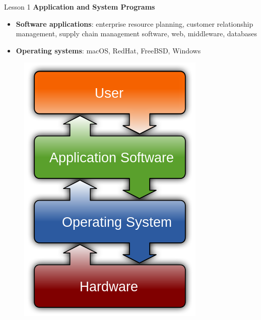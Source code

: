 \documentclass[aspectratio=1610]{beamer}
\begin{document}
\begin{frame}{Lesson 1}{}
{\Large\textbf{{Application and System Programs}}}

\Large
\begin{minipage}{0.65\textwidth}
    \begin{itemize}
      \item \textbf{Software applications}:  enterprise resource planning, customer relationship management, supply chain management software, web, middleware, databases
      \item \textbf{Operating systems}: macOS, RedHat, FreeBSD, Windows
    \end{itemize}
  \end{minipage}
\begin{minipage}{0.30\textwidth}
      \begin{figure}
        \includegraphics[scale=0.32]{Images/OS}
      \end{figure}
  \end{minipage}
\end{frame}
\end{document}
